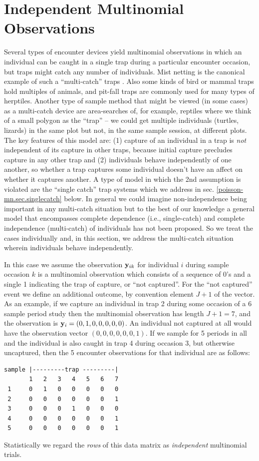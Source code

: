 \section{Independent Multinomial Observations}
\label{poisson-mn.sec.multinomial}

Several types of encounter devices yield multinomial observations in
which an individual can be caught in a single trap during a particular
encounter occasion, but traps might catch any number of individuals.
Mist netting is the canonical example of such a ``multi-catch'' traps
\citep{efford_etal:2009euring}. Also some kinds of bird or mammal
traps hold multiples of animals, and pit-fall traps are commonly used
for many types of herptiles.  Another type of sample method that might
be viewed (in some cases) as a multi-catch device are area-searches
of, for example, reptiles where we think of a small polygon as the
``trap'' -- we could get multiple individuals (turtles, lizards) in
the same plot but not, in the same sample session, at different plots.
The key features of this model are: (1) capture of an individual in a
trap is {\it not} independent of its capture in other traps, because
 initial capture
 precludes capture in any other trap and (2)
individuals  behave independently of one another, so 
whether a trap captures some 
individual doesn't have an affect on whether it captures another.  A
type of model in which the
2nd 
assumption is violated  are the ``single
catch'' trap systems which we address in
sec. \ref{poisson-mn.sec.singlecatch} below. In general we could
imagine non-independence being important in any multi-catch situation
but to the best of our knowledge a general model that encompasses
complete dependence (i.e., single-catch) and complete independence
(multi-catch) of individuals has not been proposed.  So we treat the
cases individually and, in this section, we address the multi-catch
situation wherein individuals behave independently.


In this case we assume the observation ${\bf y}_{ik}$ for individual
$i$ during sample occasion $k$ is a multinomial observation which
consists of a sequence of 0's and  a single 1 indicating the
trap of capture, or ``not captured''. For the ``not captured'' event
we define an additional outcome, by convention element $J+1$ of the
vector.  As an example, if we capture an individual in trap 2 during
some occasion of a
6 sample period study then the multinomial observation has length $J+1
= 7$, and the observation is ${\bf y}_{i} = (0,1,0,0,0,0,0)$. An
individual not captured at all would have the observation vector
$(0,0,0,0,0,0,1)$.  If we sample for 5 periods in all and the
individual is also caught in trap 4 during occasion 3, but otherwise
uncaptured, then the 5 encounter observations for that individual are
as follows:
\begin{verbatim}
sample |---------trap ---------|
       1   2   3   4   5   6   7
 1     0   1   0   0   0   0   0
 2     0   0   0   0   0   0   1
 3     0   0   0   1   0   0   0
 4     0   0   0   0   0   0   1
 5     0   0   0   0   0   0   1
\end{verbatim}
Statistically we regard the {\it rows} of this data matrix as {\it
  independent} multinomial trials.

